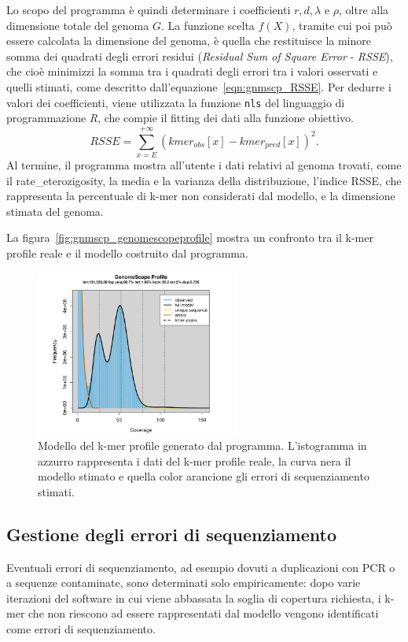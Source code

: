 \documentclass[crop=false, class=book]{standalone}
\begin{document}
	Lo scopo del programma è quindi determinare i coefficienti $r, d, \lambda$ e $\rho$, oltre alla dimensione totale del genoma $G$. La funzione scelta $f(X)$, tramite cui poi può essere calcolata la dimensione del genoma, è quella che restituisce la minore somma dei quadrati degli errori residui (\textit{Residual Sum of Square Error} - \textit{RSSE}), che cioè minimizzi la somma tra i quadrati degli errori tra i valori osservati e quelli stimati, come descritto dall'equazione~\vref{eqn:gnmscp_RSSE}. Per dedurre i valori dei coefficienti, viene utilizzata la funzione \verb|nls| del linguaggio di programmazione \textit{R}, che compie il \gls{fitting} dei dati alla funzione obiettivo.
	\begin{equation}
		RSSE = \sum_{x=E}^{+\infty} \left(kmer_{obs}[x] - kmer_{pred}[x]\right)^2.
	\label{eqn:gnmscp_RSSE}
	\end{equation}
	Al termine, il programma mostra all'utente i dati relativi al genoma trovati, come il \gls{rate_eterozigosity}, la media e la varianza della distribuzione, l'indice RSSE, che rappresenta la percentuale di k-mer non considerati dal modello, e la dimensione stimata del genoma.
	
	La figura~\vref{fig:gnmscp_genomescopeprofile} mostra un confronto tra il k-mer profile reale e il modello costruito dal programma.
	
	\begin{figure}
		\centering
		\includegraphics[width=0.6\textwidth]{capitoli/metodi analizzati/genomescope/gnmscp_genomescopeprofile.png}
		\caption{Modello del k-mer profile generato dal programma. L'istogramma in azzurro rappresenta i dati del k-mer profile reale, la curva nera il modello stimato e quella color arancione gli errori di sequenziamento stimati.}
		\label{fig:gnmscp_genomescopeprofile}
	\end{figure}

	\subsection{Gestione degli errori di sequenziamento}
	Eventuali errori di sequenziamento, ad esempio dovuti a duplicazioni con PCR o a sequenze contaminate, sono determinati solo empiricamente: dopo varie iterazioni del software in cui viene abbassata la soglia di copertura richiesta, i k-mer che non riescono ad essere rappresentati dal modello vengono identificati come errori di sequenziamento. 
	
\end{document}
